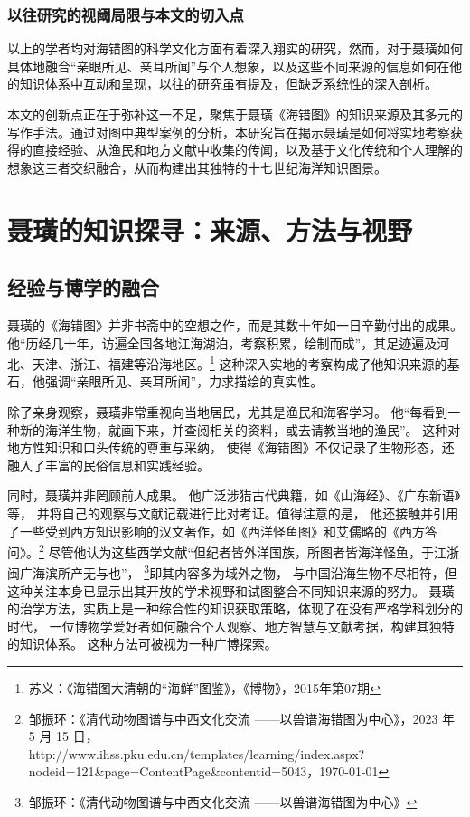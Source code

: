 \documentclass{source/Paper}
\begin{document}
\subsubsection{以往研究的视阈局限与本文的切入点}
以上的学者均对海错图的科学文化方面有着深入翔实的研究，然而，对于聂璜如何具体地融合“亲眼所见、亲耳所闻”与个人想象，以及这些不同来源的信息如何在他的知识体系中互动和呈现，以往的研究虽有提及，但缺乏系统性的深入剖析。

本文的创新点正在于弥补这一不足，聚焦于聂璜《海错图》的知识来源及其多元的写作手法。通过对图中典型案例的分析，本研究旨在揭示聂璜是如何将实地考察获得的直接经验、从渔民和地方文献中收集的传闻，以及基于文化传统和个人理解的想象这三者交织融合，从而构建出其独特的十七世纪海洋知识图景。
\section{聂璜的知识探寻：来源、方法与视野}
\subsection{经验与博学的融合}
聂璜的《海错图》并非书斋中的空想之作，而是其数十年如一日辛勤付出的成果。
他“历经几十年，访遍全国各地江海湖泊，考察积累，绘制而成”，其足迹遍及河北、天津、浙江、福建等沿海地区。\footnote{苏义：《\textlangle 海错图\textrangle 大清朝的“海鲜”图鉴》，《博物》，2015年第07期}
这种深入实地的考察构成了他知识来源的基石，他强调“亲眼所见、亲耳所闻”，力求描绘的真实性。

除了亲身观察，聂璜非常重视向当地居民，尤其是渔民和海客学习。
他“每看到一种新的海洋生物，就画下来，并查阅相关的资料，或去请教当地的渔民”。
这种对地方性知识和口头传统的尊重与采纳，
使得《海错图》不仅记录了生物形态，还融入了丰富的民俗信息和实践经验。

同时，聂璜并非罔顾前人成果。
他广泛涉猎古代典籍，如《山海经》、《广东新语》等，
并将自己的观察与文献记载进行比对考证。值得注意的是，
他还接触并引用了一些受到西方知识影响的汉文著作，如《西洋怪鱼图》和艾儒略的《西方答问》。\footnote{邹振环：《清代动物图谱与中西文化交流 ——以\textlangle 兽谱\textrangle \textlangle 海错图\textrangle 为中心》，2023 年 5 月 15 日，\\http://www.ihss.pku.edu.cn/templates/learning/index.aspx?nodeid=121\&page=ContentPage\&contentid=5043，\today}
尽管他认为这些西学文献“但纪者皆外洋国族，所图者皆海洋怪鱼，于江浙闽广海滨所产无与也”，
\footnote{邹振环：《清代动物图谱与中西文化交流 ——以\textlangle 兽谱\textrangle \textlangle 海错图\textrangle 为中心》}即其内容多为域外之物，
与中国沿海生物不尽相符，但这种关注本身已显示出其开放的学术视野和试图整合不同知识来源的努力。
聂璜的治学方法，实质上是一种综合性的知识获取策略，体现了在没有严格学科划分的时代，
一位博物学爱好者如何融合个人观察、地方智慧与文献考据，构建其独特的知识体系。
这种方法可被视为一种广博探索。
\end{document}
